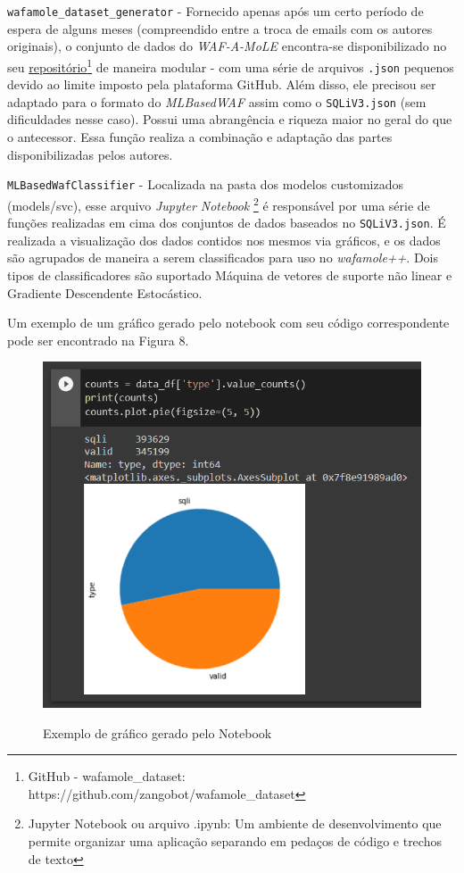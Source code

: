 \begin{alineas}
\begin{alineas}
\item \verb+wafamole_dataset_generator+ - Fornecido apenas após um certo período de espera de alguns meses (compreendido entre a troca de emails com os autores originais), o conjunto de dados do \textit{WAF-A-MoLE} encontra-se disponibilizado no seu \href{https://github.com/zangobot/wafamole_dataset}{repositório}\footnote{GitHub - wafamole\_dataset: https://github.com/zangobot/wafamole_dataset} de maneira modular - com uma série de arquivos \verb+.json+ pequenos devido ao limite imposto pela plataforma GitHub. Além disso, ele precisou ser adaptado para o formato do \textit{MLBasedWAF} assim como o \verb+SQLiV3.json+ (sem dificuldades nesse caso). Possui uma abrangência e riqueza maior no geral do que o antecessor. Essa função realiza a combinação e adaptação das partes disponibilizadas pelos autores.

\end{alineas}
\item \verb+MLBasedWafClassifier+ - Localizada na pasta dos modelos customizados (models/svc), esse arquivo \textit{Jupyter Notebook} \footnote{Jupyter Notebook ou arquivo .ipynb: Um ambiente de desenvolvimento que permite organizar uma aplicação separando em pedaços de código e trechos de texto} é responsável por uma série de funções realizadas em cima dos conjuntos de dados baseados no \verb+SQLiV3.json+. É realizada a visualização dos dados contidos nos mesmos via gráficos, e os dados são agrupados de maneira a serem classificados para uso no \textit{wafamole++}. Dois tipos de classificadores são suportado Máquina de vetores de suporte não linear e Gradiente Descendente Estocástico. 

Um exemplo de um gráfico gerado pelo notebook com seu código correspondente pode ser encontrado na Figura 8.

\begin{figure}[ht]
    \centering
    \caption{Exemplo de gráfico gerado pelo Notebook}
    \includegraphics[width=16cm]{figuras/exemplo_grafico_notebook.png} 
    \label{fig:internet} 
\end{figure}


\end{alineas}
